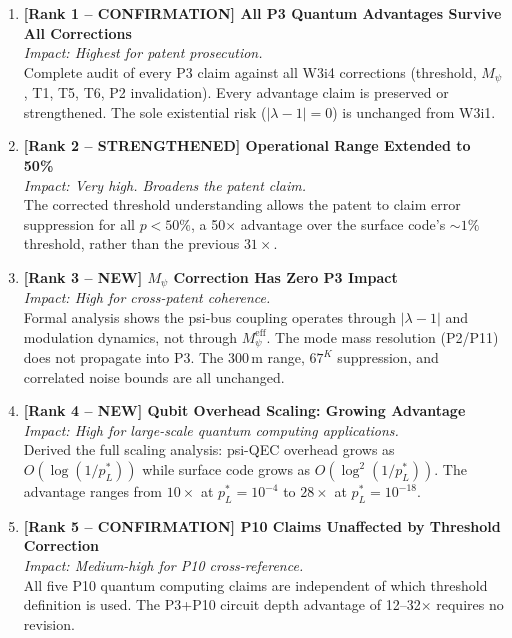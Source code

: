 \documentclass[11pt]{article}
\theoremstyle{definition}
\theoremstyle{remark}
\begin{document}
\begin{enumerate}

\item \textbf{[Rank 1 -- CONFIRMATION] All P3 Quantum Advantages Survive
  All Corrections}\\
  \textit{Impact: Highest for patent prosecution.}\\
  Complete audit of every P3 claim against all W3i4 corrections (threshold,
  $M_\psi$, T1, T5, T6, P2 invalidation).  Every advantage claim is
  preserved or strengthened.  The sole existential risk ($|\lambda-1| = 0$)
  is unchanged from W3i1.

\item \textbf{[Rank 2 -- STRENGTHENED] Operational Range Extended to 50\%}\\
  \textit{Impact: Very high.  Broadens the patent claim.}\\
  The corrected threshold understanding allows the patent to claim error
  suppression for all $p < 50\%$, a 50$\times$ advantage over the surface
  code's $\sim1\%$ threshold, rather than the previous $31\times$.

\item \textbf{[Rank 3 -- NEW] $M_\psi$ Correction Has Zero P3 Impact}\\
  \textit{Impact: High for cross-patent coherence.}\\
  Formal analysis shows the psi-bus coupling operates through $|\lambda-1|$
  and modulation dynamics, not through $M_\psi^{\mathrm{eff}}$.  The mode
  mass resolution (P2/P11) does not propagate into P3.  The 300\,m range,
  $67^K$ suppression, and correlated noise bounds are all unchanged.

\item \textbf{[Rank 4 -- NEW] Qubit Overhead Scaling: Growing Advantage}\\
  \textit{Impact: High for large-scale quantum computing applications.}\\
  Derived the full scaling analysis: psi-QEC overhead grows as
  $O(\log(1/p_L^*))$ while surface code grows as
  $O(\log^2(1/p_L^*))$.  The advantage ranges from
  $10\times$ at $p_L^* = 10^{-4}$ to $28\times$ at $p_L^* = 10^{-18}$.

\item \textbf{[Rank 5 -- CONFIRMATION] P10 Claims Unaffected by Threshold
  Correction}\\
  \textit{Impact: Medium-high for P10 cross-reference.}\\
  All five P10 quantum computing claims are independent of which threshold
  definition is used.  The P3+P10 circuit depth advantage of 12--32$\times$
  requires no revision.


\end{enumerate}
\end{document}
